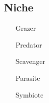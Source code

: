 \subsection{Niche}

	\begin{itemize}		
		\item[Grazer]
		\item[Predator ]
		\item[Scavenger]
		\item[Parasite]
		\item[Symbiote]
	\end{itemize}


